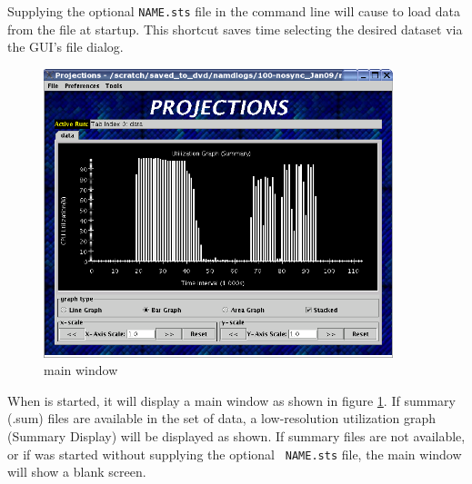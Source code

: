 \documentclass[10pt]{report}
\begin{document}
Supplying the optional {\tt NAME.sts} file in the command line will
cause \projections{} to load data from the file at startup. This shortcut
saves time selecting the desired dataset via the GUI's file dialog.

\begin{figure}[hbt]
\center
\includegraphics[width=4.0in]{fig/front-with-summary}
\caption{\projections{} main window}
\label{mainwindow}
\end{figure}

When \projections{} is started, it will display a main window as shown
in figure \ref{mainwindow}. If summary (.sum) files are available in
the set of data, a low-resolution utilization graph (Summary Display)
will be displayed as shown. If summary files are not available, or if
\projections{} was started without supplying the optional {\tt
NAME.sts} file, the main window will show a blank screen.

\end{document}
